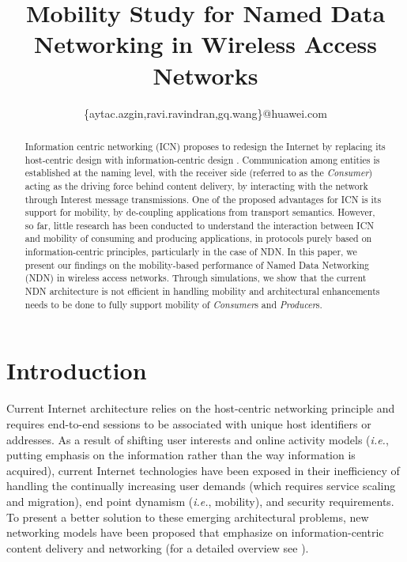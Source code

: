 \documentclass[conference]{IEEEtran}
\begin{document}
\title{Mobility Study for Named Data Networking in Wireless Access Networks}

\author{
\{aytac.azgin,ravi.ravindran,gq.wang\}{@huawei.com}}

\maketitle

\begin{abstract}
Information centric networking (ICN) proposes to redesign the Internet by replacing its host-centric design with information-centric design \cite{ICNforest}. Communication among entities is established at the naming level, with the receiver side (referred to as the \emph{Consumer}) acting as the driving force behind content delivery, by interacting with the network through Interest message transmissions. One of the proposed advantages for ICN is its support for mobility, by de-coupling applications from transport semantics. However, so far, little research has been conducted to understand the interaction between ICN and mobility of consuming and producing applications, in protocols purely based on information-centric principles, particularly in the case of NDN. In this paper, we present our findings on the mobility-based performance of Named Data Networking (NDN) in wireless access networks. Through simulations, we show that the current NDN architecture is not efficient in handling mobility and architectural enhancements needs to be done to fully support mobility of \emph{Consumer}s and \emph{Producer}s.
\end{abstract}

\section{Introduction}

Current Internet architecture relies on the host-centric networking principle and requires end-to-end sessions to be associated with unique host identifiers or addresses. As a result of shifting user interests and online activity models (\emph{i.e.}, putting emphasis on the information rather than the way information is acquired), current Internet technologies have been exposed in their inefficiency of handling the continually increasing user demands (which requires service scaling and migration), end point dynamism (\emph{i.e.}, mobility), and security requirements. To present a better solution to these emerging architectural problems, new networking models have been proposed that emphasize on information-centric content delivery and networking (for a detailed overview see \cite{SurveyICN}).
\end{document}
